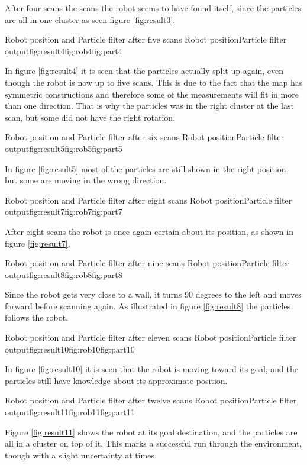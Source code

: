 \FloatBarrier
After four scans the scans the robot seems to have found itself, since the particles are all in one cluster as seen figure \ref{fig:result3}.


{Robot position and Particle filter after five scans}
{Robot position}{Particle filter output}{fig:result4}{fig:rob4}{fig:part4}

\FloatBarrier
In figure \ref{fig:result4} it is seen that the particles actually split up again, even though the robot is now up to five scans. This is due to the fact that the map has symmetric constructions and therefore some of the measurements will fit in more than one direction. That is why the particles was in the right cluster at the last scan, but some did not have the right rotation. 


{Robot position and Particle filter after six scans}
{Robot position}{Particle filter output}{fig:result5}{fig:rob5}{fig:part5}

\FloatBarrier
In figure \ref{fig:result5} most of the particles are still shown in the right position, but some are moving in the wrong direction.


{Robot position and Particle filter after eight scans}
{Robot position}{Particle filter output}{fig:result7}{fig:rob7}{fig:part7}

\FloatBarrier
After eight scans the robot is once again certain about its position, as shown in figure \ref{fig:result7}.


{Robot position and Particle filter after nine scans}
{Robot position}{Particle filter output}{fig:result8}{fig:rob8}{fig:part8}

\FloatBarrier
Since the robot gets very close to a wall, it turns 90 degrees to the left and moves forward before scanning again. As illustrated in figure  \ref{fig:result8} the particles follows the robot.


{Robot position and Particle filter after eleven scans}
{Robot position}{Particle filter output}{fig:result10}{fig:rob10}{fig:part10}

\FloatBarrier
In figure \ref{fig:result10} it is seen that the robot is moving toward its goal, and the particles still have knowledge about its approximate position.


{Robot position and Particle filter after twelve scans}
{Robot position}{Particle filter output}{fig:result11}{fig:rob11}{fig:part11}

\FloatBarrier
Figure \ref{fig:result11} shows the robot at its goal destination, and the particles are all in a cluster on top of it. This marks a successful run through the environment, though with a slight uncertainty at times.

 